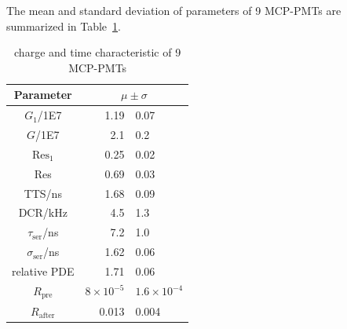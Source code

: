 The mean and standard deviation of parameters of 9 MCP-PMTs are summarized in Table~\ref{tab:summary}.
\begin{table}
    \centering
    \caption{charge and time characteristic of 9 MCP-PMTs}
    \label{tab:summary}
    \begin{tabular}{c| r @{$\pm$} l}
        Parameter&\multicolumn{2}{c}{$\mu\pm\sigma$}\\
        \hline
        $G_1$/1E7&1.19&0.07\\
        $G$/1E7&2.1&0.2\\
        $\mathrm{Res}_1$&0.25&0.02\\
        Res&0.69&0.03\\
        TTS/ns&1.68&0.09\\
        DCR/kHz&4.5&1.3\\
        $\tau_{\mathrm{ser}}$/ns&7.2&1.0\\
        $\sigma_{\mathrm{ser}}$/ns&1.62&0.06\\
        relative PDE&1.71&0.06\\
        $R_{\mathrm{pre}}$&$8\times10^{-5}$&$1.6\times10^{-4}$\\
        $R_{\mathrm{after}}$&0.013&0.004\\
        \hline
    \end{tabular}
\end{table}
